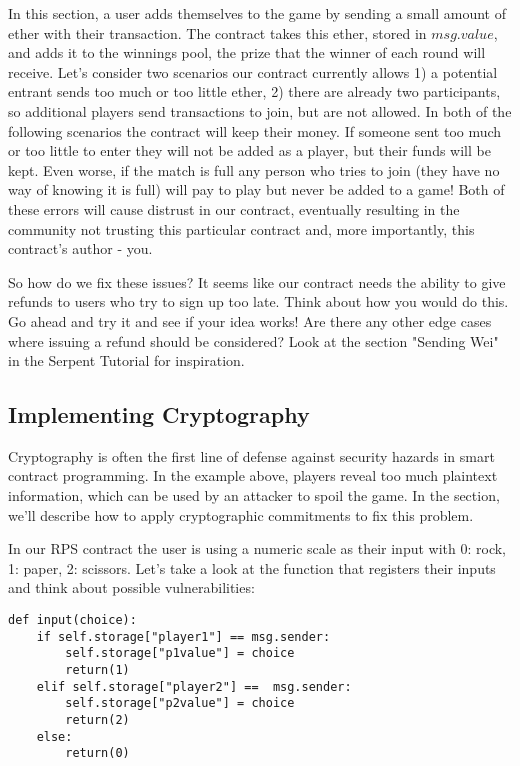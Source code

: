 \documentclass[10pt,twocolumn,letterpaper]{article}
\begin{document}
In this section, a user adds themselves to the game by sending a small amount of ether with their transaction. The contract takes this ether, stored in $msg.value$, and adds it to the winnings pool, the prize that the winner of each round will receive. Let's consider two scenarios our contract currently allows 1) a potential entrant sends too much or too little ether, 2) there are already two participants, so additional players send transactions to join, but are not allowed. In both of the following scenarios the contract will keep their money. If someone sent too much or too little to enter they will not be added as a player, but their funds will be kept. Even worse, if the match is full any person who tries to join (they have no way of knowing it is full) will pay to play but never be added to a game! Both of these errors will cause distrust in our contract, eventually resulting in the community not trusting this particular contract and, more importantly, this contract's author - you.

So how do we fix these issues? It seems like our contract needs the ability to give refunds to users who try to sign up too late. Think about how you would do this. Go ahead and try it and see if your idea works! Are there any other edge cases where issuing a refund should be considered? Look at the section "Sending Wei" in the Serpent Tutorial for inspiration.

\subsection{Implementing Cryptography}
Cryptography is often the first line of defense against security hazards in smart contract programming. In the example above, players reveal too much plaintext information, which can be used by an attacker to spoil the game. In the section, we'll describe how to apply cryptographic commitments to fix this problem.

In our RPS contract the user is using a numeric scale as their input with 0: rock, 1: paper, 2: scissors. Let's take a look at the function that registers their inputs and think about possible vulnerabilities:

\begin{mdframed}
\begin{verbatim}
def input(choice):
	if self.storage["player1"] == msg.sender:
		self.storage["p1value"] = choice
		return(1)
	elif self.storage["player2"] ==  msg.sender:
		self.storage["p2value"] = choice
		return(2)
	else:
		return(0)
\end{verbatim}
\end{mdframed}
\end{document}
